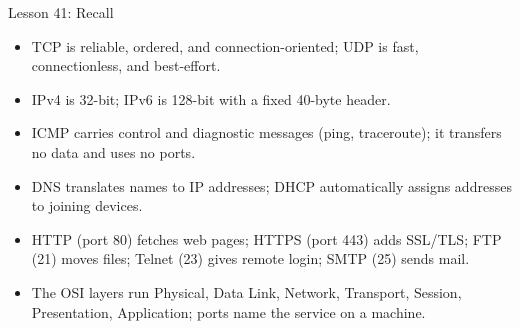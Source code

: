 \documentclass[aspectratio=169]{beamer}
\begin{document}
\begin{frame}{Lesson 41: Recall}
  \begin{itemize}
    \item TCP is reliable, ordered, and connection-oriented; UDP is fast,
      connectionless, and best-effort.
    \item IPv4 is 32-bit; IPv6 is 128-bit with a fixed 40-byte header.
    \item ICMP carries control and diagnostic messages (ping, traceroute);
      it transfers no data and uses no ports.
    \item DNS translates names to IP addresses; DHCP automatically assigns
      addresses to joining devices.
    \item HTTP (port 80) fetches web pages; HTTPS (port 443) adds SSL/TLS;
      FTP (21) moves files; Telnet (23) gives remote login; SMTP (25) sends
      mail.
    \item The OSI layers run Physical, Data Link, Network, Transport,
      Session, Presentation, Application; ports name the service on a
      machine.
  \end{itemize}
\end{frame}
\end{document}
